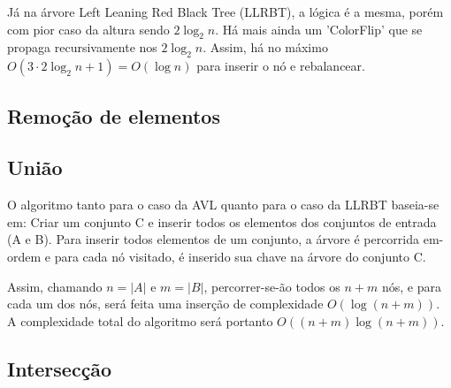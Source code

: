 \documentclass{article}
\begin{document}
Já na árvore Left Leaning Red Black Tree (LLRBT), a lógica é a mesma, porém com pior caso da altura sendo $2\log_2 n$. 
Há mais ainda um 'ColorFlip' que se propaga recursivamente nos $2\log_2 n$. Assim, há no máximo
$O(3 \cdot 2 \log_2 n + 1) = O(\log n)$ para inserir o nó e rebalancear.

\subsection{Remoção de elementos}

\subsection{União}
O algoritmo tanto para o caso da AVL quanto para o caso da LLRBT baseia-se em:
Criar um conjunto C e inserir todos os elementos dos conjuntos de entrada (A e B). Para inserir todos elementos de um
conjunto, a árvore é percorrida em-ordem e para cada nó visitado, é inserido sua chave na árvore do conjunto C.

Assim, chamando $n = |A|$ e $m = |B|$, percorrer-se-ão todos os $n+m$ nós, e para cada um dos nós, será feita uma inserção
de complexidade $O(\log(n+m))$. A complexidade total do algoritmo será portanto $O((n+m)\log(n+m))$.

\subsection{Intersecção}
\end{document}
